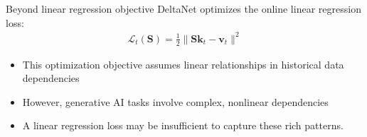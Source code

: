 \begin{frame}{Beyond linear regression objective}
      DeltaNet optimizes the online linear regression loss:
    \begin{align*}
      \mathcal{L}_t(\mathbf{S}) = \frac{1}{2}\|\mathbf{S} \mathbf{k}_t - \mathbf{v}_t\|^2
    \end{align*}
    \begin{itemize}
        \item This optimization objective assumes linear relationships in historical data dependencies
        \item However, generative AI tasks involve complex, nonlinear dependencies
        \item A linear regression loss may be insufficient to capture these rich patterns.
    \end{itemize}
  \end{frame}
